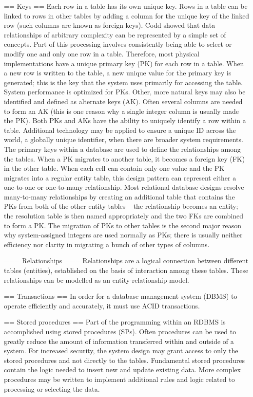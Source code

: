 == Keys ==
Each row in a table has its own unique key. Rows in a table can be linked to rows in other tables by adding a column for the unique key of the linked row (such columns are known as foreign keys). Codd showed that data relationships of arbitrary complexity can be represented by a simple set of concepts.
Part of this processing involves consistently being able to select or modify one and only one row in a table. Therefore, most physical implementations have a unique primary key (PK) for each row in a table. When a new row is written to the table, a new unique value for the primary key is generated; this is the key that the system uses primarily for accessing the table. System performance is optimized for PKs. Other, more natural keys may also be identified and defined as alternate keys (AK). Often several columns are needed to form an AK (this is one reason why a single integer column is usually made the PK). Both PKs and AKs have the ability to uniquely identify a row within a table. Additional technology may be applied to ensure a unique ID across the world, a globally unique identifier, when there are broader system requirements.
The primary keys within a database are used to define the relationships among the tables. When a PK migrates to another table, it becomes a foreign key (FK) in the other table. When each cell can contain only one value and the PK migrates into a regular entity table, this design pattern can represent either a one-to-one or one-to-many relationship. Most relational database designs resolve many-to-many relationships by creating an additional table that contains the PKs from both of the other entity tables –  the relationship becomes an entity; the resolution table is then named appropriately and the two FKs are combined to form a PK. The migration of PKs to other tables is the second major reason why system-assigned integers are used normally as PKs; there is usually neither efficiency nor clarity in migrating a bunch of other types of columns.


=== Relationships ===
Relationships are a logical connection between different tables (entities), established on the basis of interaction among these tables. These relationships can be modelled as an entity-relationship model.


== Transactions ==
In order for a database management system (DBMS) to operate efficiently and accurately, it must use ACID transactions.


== Stored procedures ==
Part of the programming within an RDBMS is accomplished using stored procedures (SPs). Often procedures can be used to greatly reduce the amount of information transferred within and outside of a system. For increased security, the system design may grant access to only the stored procedures and not directly to the tables. Fundamental stored procedures contain the logic needed to insert new and update existing data. More complex procedures may be written to implement additional rules and logic related to processing or selecting the data.


